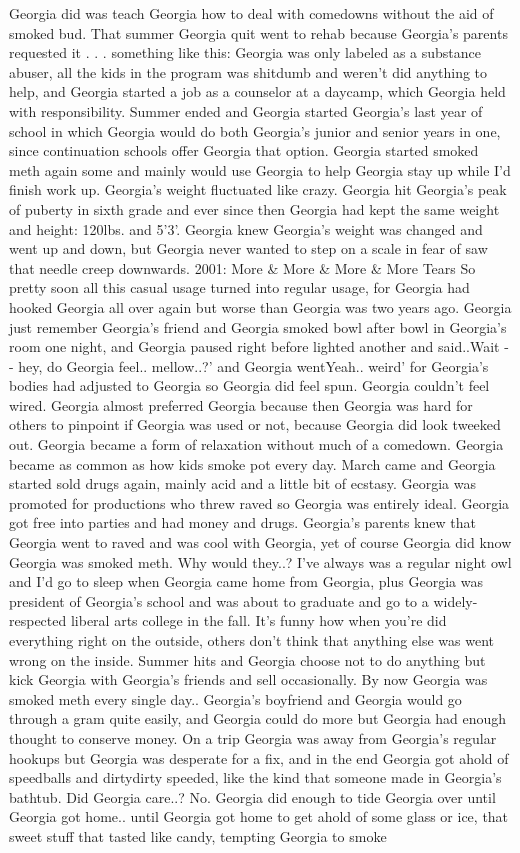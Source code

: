 \documentclass[12pt]{book}
\begin{document}
Georgia did was teach Georgia how to deal with comedowns without the aid of smoked bud. That summer Georgia quit went to rehab because Georgia's parents requested it . . .  something like this: Georgia was only labeled as a substance abuser, all the kids in the program was shitdumb and weren't did anything to help, and Georgia started a job as a counselor at a daycamp, which Georgia held with responsibility. Summer ended and Georgia started Georgia's last year of school in which Georgia would do both Georgia's junior and senior years in one, since continuation schools offer Georgia that option. Georgia started smoked meth again some and mainly would use Georgia to help Georgia stay up while I'd finish work up. Georgia's weight fluctuated like crazy. Georgia hit Georgia's peak of puberty in sixth grade and ever since then Georgia had kept the same weight and height: 120lbs. and 5'3'. Georgia knew Georgia's weight was changed and went up and down, but Georgia never wanted to step on a scale in fear of saw that needle creep downwards. 2001: More \& More \& More \& More Tears So pretty soon all this casual usage turned into regular usage, for Georgia had hooked Georgia all over again but worse than Georgia was two years ago. Georgia just remember Georgia's friend and Georgia smoked bowl after bowl in Georgia's room one night, and Georgia paused right before lighted another and said..Wait - - hey, do Georgia feel.. mellow..?' and Georgia wentYeah.. weird' for Georgia's bodies had adjusted to Georgia so Georgia did feel spun. Georgia couldn't feel wired. Georgia almost preferred Georgia because then Georgia was hard for others to pinpoint if Georgia was used or not, because Georgia did look tweeked out. Georgia became a form of relaxation without much of a comedown. Georgia became as common as how kids smoke pot every day. March came and Georgia started sold drugs again, mainly acid and a little bit of ecstasy. Georgia was promoted for productions who threw raved so Georgia was entirely ideal. Georgia got free into parties and had money and drugs. Georgia's parents knew that Georgia went to raved and was cool with Georgia, yet of course Georgia did know Georgia was smoked meth. Why would they..? I've always was a regular night owl and I'd go to sleep when Georgia came home from Georgia, plus Georgia was president of Georgia's school and was about to graduate and go to a widely-respected liberal arts college in the fall. It's funny how when you're did everything right on the outside, others don't think that anything else was went wrong on the inside. Summer hits and Georgia choose not to do anything but kick Georgia with Georgia's friends and sell occasionally. By now Georgia was smoked meth every single day.. Georgia's boyfriend and Georgia would go through a gram quite easily, and Georgia could do more but Georgia had enough thought to conserve money. On a trip Georgia was away from Georgia's regular hookups but Georgia was desperate for a fix, and in the end Georgia got ahold of speedballs and dirtydirty speeded, like the kind that someone made in Georgia's bathtub. Did Georgia care..? No. Georgia did enough to tide Georgia over until Georgia got home.. until Georgia got home to get ahold of some glass or ice, that sweet stuff that tasted like candy, tempting Georgia to smoke 
\end{document}
